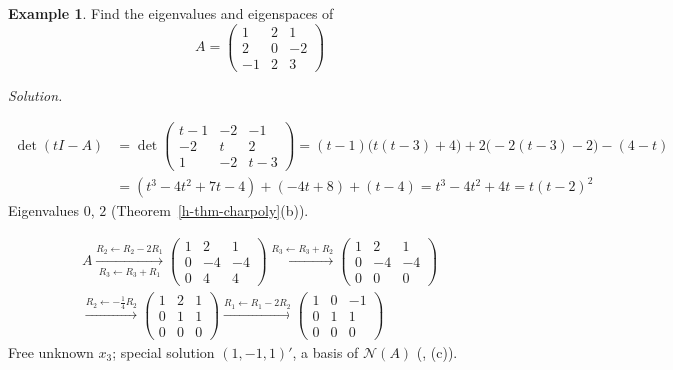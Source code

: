 \documentclass[12pt]{article}
\theoremstyle{definition}
\newtheorem{example}[theorem]{Example}
\begin{document}
\begin{example}\label{h-exm-charpoly}
Find the eigenvalues and eigenspaces of
\[
A=\begin{pmatrix}1&2&1\\2&0&-2\\-1&2&3\end{pmatrix}
\]
\end{example}
\textit{Solution.}
\begin{board}
\[
\begin{aligned}
\det(tI-A)&=\det\begin{pmatrix}t-1&-2&-1\\-2&t&2\\1&-2&t-3\end{pmatrix}
=(t-1)\bigl(t(t-3)+4\bigr)+2\bigl(-2(t-3)-2\bigr)-(4-t)\\
&=(t^3-4t^2+7t-4)+(-4t+8)+(t-4)=t^3-4t^2+4t=t(t-2)^2
\end{aligned}
\]
Eigenvalues \(0\), \(2\) (Theorem~\ref{h-thm-charpoly}(b)).
\end{board}
\begin{board}[\(\lambda=0\): reduce \(A-0I=A\); a basis of \(\mathcal N(A)\):]
\[
\begin{gathered}
A\xrightarrow[R_3\leftarrow R_3+R_1]{R_2\leftarrow R_2-2R_1}
\begin{pmatrix}1&2&1\\0&-4&-4\\0&4&4\end{pmatrix}
\xrightarrow{R_3\leftarrow R_3+R_2}
\begin{pmatrix}1&2&1\\0&-4&-4\\0&0&0\end{pmatrix}
\\
\xrightarrow{R_2\leftarrow-\frac14R_2}
\begin{pmatrix}1&2&1\\0&1&1\\0&0&0\end{pmatrix}
\xrightarrow{R_1\leftarrow R_1-2R_2}
\begin{pmatrix}1&0&-1\\0&1&1\\0&0&0\end{pmatrix}
\end{gathered}
\]
Free unknown \(x_3\); special solution \((1,-1,1)'\), a basis of \(\mathcal N(A)\) (, (c)).
\end{board}
\end{document}
